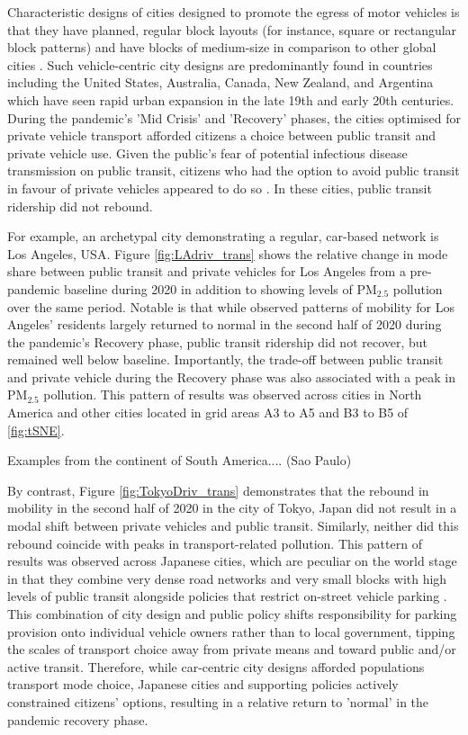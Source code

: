 \documentclass[preprint,12pt]{elsarticle}
\begin{document}
Characteristic designs of cities designed to promote the egress of motor vehicles is that they have planned, regular block layouts (for instance, square or rectangular block patterns) and have blocks of medium-size in comparison to other global cities \cite{Thompson2020}. Such vehicle-centric city designs are predominantly found in countries including the United States, Australia, Canada, New Zealand, and Argentina which have seen rapid urban expansion in the late 19th and early 20th centuries. During the pandemic's 'Mid Crisis' and 'Recovery' phases, the cities optimised for private vehicle transport afforded citizens a choice between public transit and private vehicle use. Given the public's fear of potential infectious disease transmission on public transit\cite{fernando2023shaping}, citizens who had the option to avoid public transit in favour of private vehicles appeared to do so . In these cities, public transit ridership did not rebound. 

For example, an archetypal city demonstrating a regular, car-based network is Los Angeles, USA. Figure \ref{fig:LAdriv_trans} shows the relative change in mode share between public transit and private vehicles for Los Angeles from a pre-pandemic baseline during 2020 in addition to showing levels of PM$_{2.5}$ pollution over the same period. Notable is that while observed patterns of mobility for Los Angeles' residents largely returned to normal in the second half of 2020 during the pandemic's Recovery phase, public transit ridership did not recover, but remained well below baseline. Importantly, the trade-off between public transit and private vehicle during the Recovery phase was also associated with a peak in PM$_{2.5}$ pollution. This pattern of results was observed across cities in North America and other cities located in grid areas A3 to A5 and B3 to B5 of \ref{fig:tSNE}.

Examples from the continent of South America.... (Sao Paulo)

By contrast, Figure \ref{fig:TokyoDriv_trans} demonstrates that the rebound in mobility in the second half of 2020 in the city of Tokyo, Japan did not result in a modal shift between private vehicles and public transit. Similarly, neither did this rebound coincide with peaks in transport-related pollution. This pattern of results was observed across Japanese cities, which are peculiar on the world stage in that they combine very dense road networks and very small blocks with high levels of public transit alongside policies that restrict on-street vehicle parking \cite{clements2019socialising}. This combination of city design and public policy shifts responsibility for parking provision onto individual vehicle owners rather than to local government, tipping the scales of transport choice away from private means and toward public and/or active transit. Therefore, while car-centric city designs afforded populations transport mode choice, Japanese cities and supporting policies actively constrained citizens' options, resulting in a relative return to 'normal' in the pandemic recovery phase.
\end{document}

